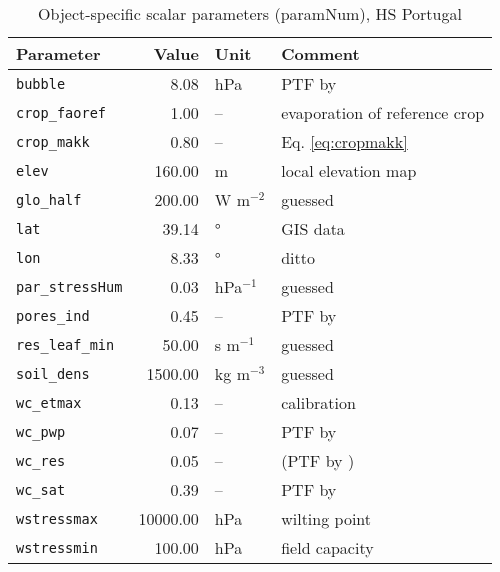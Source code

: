 \begin{table}[ht]
\centering
\caption{Object-specific scalar parameters (\textsf{paramNum}), HS Portugal} 
\label{tab:portugalHS_paramNum}
\begin{tabular}{lrll}
  \hline
Parameter & Value & Unit & Comment \\ 
  \hline
\verb!bubble! & 8.08 & hPa & PTF by \citet{rawls85} \\ 
  \verb!crop_faoref! & 1.00 & -- & evaporation of reference crop \\ 
  \verb!crop_makk! & 0.80 & -- & Eq. \eqref{eq:cropmakk} \\ 
  \verb!elev! & 160.00 & m & local elevation map \\ 
  \verb!glo_half! & 200.00 & W m$^{-2}$ & guessed \\ 
  \verb!lat! & 39.14 & ° & GIS data \\ 
  \verb!lon! & 8.33 & ° & ditto \\ 
  \verb!par_stressHum! & 0.03 & hPa$^{-1}$ & guessed \\ 
  \verb!pores_ind! & 0.45 & -- & PTF by \citet{rawls85} \\ 
  \verb!res_leaf_min! & 50.00 & s m$^{-1}$ & guessed \\ 
  \verb!soil_dens! & 1500.00 & kg m$^{-3}$ & guessed \\ 
  \verb!wc_etmax! & 0.13 & -- & calibration \\ 
  \verb!wc_pwp! & 0.07 & -- & PTF by \citet{rawls85} \\ 
  \verb!wc_res! & 0.05 & -- & (PTF by \citet{rawls85}) \\ 
  \verb!wc_sat! & 0.39 & -- & PTF by \citet{woesten99} \\ 
  \verb!wstressmax! & 10000.00 & hPa & wilting point \\ 
  \verb!wstressmin! & 100.00 & hPa & field capacity \\ 
   \hline
\end{tabular}
\end{table}
